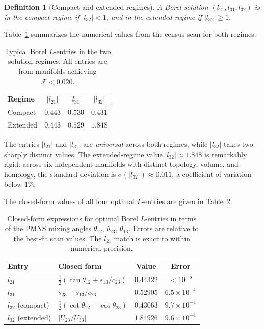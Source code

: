 \documentclass[11pt,a4paper]{article}
\newtheorem{definition}{Definition}
\begin{document}
\begin{definition}[Compact and extended regimes]
\label{def:regimes}
A Borel solution $(l_{21}, l_{31}, l_{32})$ is in the
\emph{compact regime} if $|l_{32}| < 1$, and in the
\emph{extended regime} if $|l_{32}| \geq 1$.
\end{definition}
 
Table~\ref{tab:regimes} summarizes the numerical values from the
census scan for both regimes.
 
\begin{table}[h]
\centering
\caption{Typical Borel $L$-entries in the two solution regimes.
All entries are from manifolds achieving $\mathcal{F} < 0.020$.}
\label{tab:regimes}
\begin{tabular}{lccc}
\toprule
Regime & $|l_{21}|$ & $|l_{31}|$ & $|l_{32}|$ \\
\midrule
Compact  & $0.443$ & $0.530$ & $0.431$ \\
Extended & $0.443$ & $0.529$ & $1.848$ \\
\bottomrule
\end{tabular}
\end{table}
 
The entries $|l_{21}|$ and $|l_{31}|$ are \emph{universal} across
both regimes, while $|l_{32}|$ takes two sharply distinct values.
The extended-regime value $|l_{32}| \approx 1.848$ is remarkably
rigid: across six independent manifolds with distinct topology,
volume, and homology, the standard deviation is $\sigma(|l_{32}|)
\approx 0.011$, a coefficient of variation below $1\%$.
 
The closed-form values of all four optimal $L$-entries are
given in Table~\ref{tab:closed_form}.
 
\begin{table}[h]
\centering
\caption{Closed-form expressions for optimal Borel $L$-entries
in terms of the PMNS mixing angles
$\theta_{12}$, $\theta_{23}$, $\theta_{13}$.
Errors are relative to the best-fit scan values.
The $l_{21}$ match is exact to within numerical precision.}
\label{tab:closed_form}
\begin{tabular}{llcc}
\toprule
Entry & Closed form & Value & Error \\
\midrule
$l_{21}$          & $\tfrac{1}{2}(\tan\theta_{12} + s_{13}/c_{23})$
                  & $0.44322$ & $<10^{-5}$ \\
$l_{31}$          & $s_{23} - s_{13}/c_{23}$
                  & $0.52905$ & $6.5\times10^{-4}$ \\
$l_{32}$ (compact)  & $\tfrac{1}{2}(\cot\theta_{12} - \cos\theta_{23})$
                  & $0.43063$ & $9.7\times10^{-4}$ \\
$l_{32}$ (extended) & $|U_{23}/U_{33}|$
                  & $1.84926$ & $9.6\times10^{-4}$ \\
\bottomrule
\end{tabular}
\end{table}
 
\end{document}
